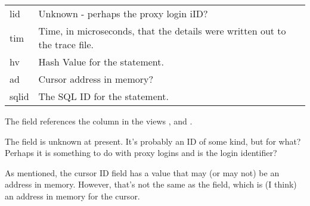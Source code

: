 \begin{longtable}[]{@{}l|l@{}}
\begin{minipage}[t]{0.14\columnwidth}\raggedright\strut
lid\strut
\end{minipage} & \begin{minipage}[t]{0.65\columnwidth}\raggedright\strut
Unknown - perhaps the proxy login iID?\strut
\end{minipage}\tabularnewline
\begin{minipage}[t]{0.14\columnwidth}\raggedright\strut
tim\strut
\end{minipage} & \begin{minipage}[t]{0.65\columnwidth}\raggedright\strut
Time, in microseconds, that the details were written out to the trace file.\strut
\end{minipage}\tabularnewline
\begin{minipage}[t]{0.14\columnwidth}\raggedright\strut
hv\strut
\end{minipage} & \begin{minipage}[t]{0.65\columnwidth}\raggedright\strut
Hash Value for the statement.\strut
\end{minipage}\tabularnewline
\begin{minipage}[t]{0.14\columnwidth}\raggedright\strut
ad\strut
\end{minipage} & \begin{minipage}[t]{0.65\columnwidth}\raggedright\strut
Cursor address in memory?\strut
\end{minipage}\tabularnewline
\begin{minipage}[t]{0.14\columnwidth}\raggedright\strut
sqlid\strut
\end{minipage} & \begin{minipage}[t]{0.65\columnwidth}\raggedright\strut
The SQL ID for the statement.\strut
\end{minipage}\tabularnewline
\bottomrule
\end{longtable}

The  field references the column  in the views ,  and .

The  field is unknown at present. It's probably an ID of some kind, but for what? Perhaps it is something to do with proxy logins and  is the login identifier?

As mentioned, the cursor ID field has a value that may (or may not) be an address in memory. However, that's not the same as the  field, which is (I think) an address in memory for the cursor.

